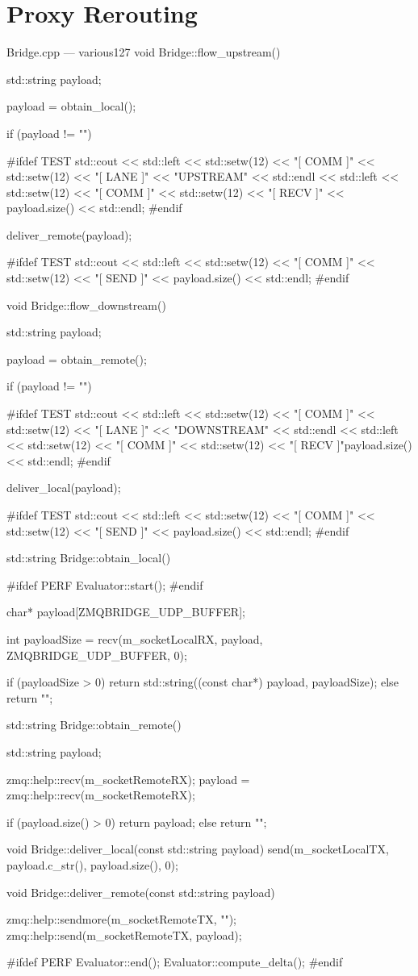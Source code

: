 \section{Proxy Rerouting}\label{ax:code:proxy}

\begin{codelist}{Bridge.cpp --- various}{127}
void Bridge::flow_upstream() {
	std::string payload;

	payload = obtain_local();

	if (payload != "") {
#ifdef TEST
		std::cout << std::left << std::setw(12) << "[ COMM ]" << std::setw(12) << "[ LANE ]" << "UPSTREAM" << std::endl
		<< std::left << std::setw(12) << "[ COMM ]" << std::setw(12) << "[ RECV ]" << payload.size() << std::endl;
#endif

		deliver_remote(payload);

#ifdef TEST
		std::cout << std::left << std::setw(12) << "[ COMM ]" << std::setw(12) << "[ SEND ]" << payload.size() << std::endl;
#endif
	}
}

void Bridge::flow_downstream() {
	std::string payload;

	payload = obtain_remote();

	if (payload != "") {
#ifdef TEST
		std::cout << std::left << std::setw(12) << "[ COMM ]" << std::setw(12) << "[ LANE ]" << "DOWNSTREAM" << std::endl
		<< std::left << std::setw(12) << "[ COMM ]" << std::setw(12) << "[ RECV ]"payload.size() << std::endl;
#endif

		deliver_local(payload);

#ifdef TEST
		std::cout << std::left << std::setw(12) << "[ COMM ]" << std::setw(12) << "[ SEND ]" << payload.size() << std::endl;
#endif
	}
}

std::string Bridge::obtain_local() {
#ifdef PERF
	Evaluator::start();
#endif

	char* payload[ZMQBRIDGE_UDP_BUFFER];

	int payloadSize = recv(m_socketLocalRX, payload, ZMQBRIDGE_UDP_BUFFER, 0);

	if (payloadSize > 0) {
		return std::string((const char*) payload, payloadSize);
	} else {
		return "";
	}
}

std::string Bridge::obtain_remote() {
	std::string payload;

	zmq::help::recv(m_socketRemoteRX);
	payload = zmq::help::recv(m_socketRemoteRX);

	if (payload.size() > 0) {
		return payload;
	} else {
		return "";
	}
}

void Bridge::deliver_local(const std::string payload) {
	send(m_socketLocalTX, payload.c_str(), payload.size(), 0);
}

void Bridge::deliver_remote(const std::string payload) {
	zmq::help::sendmore(m_socketRemoteTX, "");
	zmq::help::send(m_socketRemoteTX, payload);

#ifdef PERF
	Evaluator::end();
	Evaluator::compute_delta();
#endif
}
\end{codelist}
